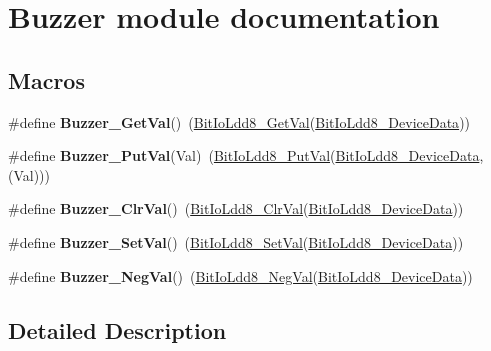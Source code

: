 \hypertarget{group___buzzer__module}{\section{Buzzer module documentation}
\label{group___buzzer__module}
}
\subsection*{Macros}
\begin{DoxyCompactItemize}
\item 
\hypertarget{group___buzzer__module_ga162500eba001e21aaa2271aa175b7eb9}{\#define {\bfseries Buzzer\-\_\-\-Get\-Val}()~(\hyperlink{group___bit_io_ldd8__module_ga371380a918d26bee32b0703204a92fc4}{Bit\-Io\-Ldd8\-\_\-\-Get\-Val}(\hyperlink{group___bit_io_ldd8__module_gaaf5f55b3173b9117dba16e493f8a9649}{Bit\-Io\-Ldd8\-\_\-\-Device\-Data}))}\label{group___buzzer__module_ga162500eba001e21aaa2271aa175b7eb9}

\item 
\hypertarget{group___buzzer__module_ga081c9c0b41926e2909de5b7ca88ad052}{\#define {\bfseries Buzzer\-\_\-\-Put\-Val}(Val)~(\hyperlink{group___bit_io_ldd8__module_ga49be1e682a047e7bcbdf2396cddb54f7}{Bit\-Io\-Ldd8\-\_\-\-Put\-Val}(\hyperlink{group___bit_io_ldd8__module_gaaf5f55b3173b9117dba16e493f8a9649}{Bit\-Io\-Ldd8\-\_\-\-Device\-Data}, (Val)))}\label{group___buzzer__module_ga081c9c0b41926e2909de5b7ca88ad052}

\item 
\hypertarget{group___buzzer__module_gade440fc90432334ef619fcf124aa3f4f}{\#define {\bfseries Buzzer\-\_\-\-Clr\-Val}()~(\hyperlink{group___bit_io_ldd8__module_ga95bb304469e99fa3999aab32b54a98f5}{Bit\-Io\-Ldd8\-\_\-\-Clr\-Val}(\hyperlink{group___bit_io_ldd8__module_gaaf5f55b3173b9117dba16e493f8a9649}{Bit\-Io\-Ldd8\-\_\-\-Device\-Data}))}\label{group___buzzer__module_gade440fc90432334ef619fcf124aa3f4f}

\item 
\hypertarget{group___buzzer__module_ga9f4e077130239ca91d7980af9c483b19}{\#define {\bfseries Buzzer\-\_\-\-Set\-Val}()~(\hyperlink{group___bit_io_ldd8__module_ga813c264d67794a7d48b21051ca6875b5}{Bit\-Io\-Ldd8\-\_\-\-Set\-Val}(\hyperlink{group___bit_io_ldd8__module_gaaf5f55b3173b9117dba16e493f8a9649}{Bit\-Io\-Ldd8\-\_\-\-Device\-Data}))}\label{group___buzzer__module_ga9f4e077130239ca91d7980af9c483b19}

\item 
\hypertarget{group___buzzer__module_gab1556cf73f524aedd9a412ede120c10d}{\#define {\bfseries Buzzer\-\_\-\-Neg\-Val}()~(\hyperlink{group___bit_io_ldd8__module_ga9b367282f6e21c61f9869f2958e8c029}{Bit\-Io\-Ldd8\-\_\-\-Neg\-Val}(\hyperlink{group___bit_io_ldd8__module_gaaf5f55b3173b9117dba16e493f8a9649}{Bit\-Io\-Ldd8\-\_\-\-Device\-Data}))}\label{group___buzzer__module_gab1556cf73f524aedd9a412ede120c10d}

\end{DoxyCompactItemize}


\subsection{Detailed Description}

